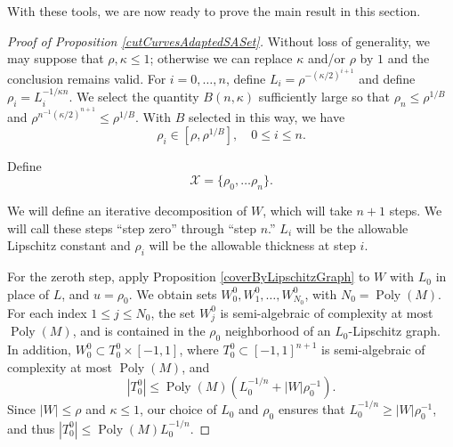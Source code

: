 \documentclass[letterpaper, reqno,11pt]{article}
\numberwithin{equation}{section}
\newcommand{\poly}{\operatorname{Poly}}
\numberwithin{thm}{section}
\theoremstyle{remark}
\begin{document}
With these tools, we are now ready to prove the main result in this section. 


\begin{proof}[Proof of Proposition \ref{cutCurvesAdaptedSASet}]
Without loss of generality, we may suppose that $\rho,\kappa\leq 1$; otherwise we can replace $\kappa$ and/or $\rho$ by $1$ and the conclusion remains valid. For $i=0,\ldots,n$, define $L_i = \rho^{-(\kappa/2)^{i+1}}$ and define $\rho_i = L_i^{-1/\kappa n}$. We select the quantity $B(n,\kappa)$ sufficiently large so that $\rho_n\leq \rho^{1/B}$ and $\rho^{n^{-1} (\kappa/2)^{n+1}}\leq\rho^{1/B}$. With $B$ selected in this way, we have 
\begin{equation}\label{rhoIGeqRho}
\rho_i\in [\rho, \rho^{1/B}],\quad 0\leq i \leq n.
\end{equation}

Define 
\[
\mathcal{X} = \{\rho_0,\ldots\rho_n\}.
\]

We will define an iterative decomposition of $W$, which will take $n+1$ steps. We will call these steps ``step zero'' through ``step $n$.'' $L_i$ will be the allowable Lipschitz constant and $\rho_i$ will be the allowable thickness at step $i$.

For the zeroth step, apply Proposition \ref{coverByLipschitzGraph} to $W$ with $L_0$ in place of $L$, and $u=\rho_0$. We obtain sets $W^0_0, W^{0}_1,\ldots, W^{0}_{N_0}$, with $N_0 = \poly(M)$. For each index $1\leq j\leq N_0$, the set $W^0_j$ is semi-algebraic of complexity at most $\poly(M)$, and is contained in the $\rho_0$ neighborhood of an $L_0$-Lipschitz graph. In addition, $W^0_0 \subset T^0_0\times[-1,1]$, where $T_0^0\subset[-1,1]^{n+1}$ is semi-algebraic of complexity at most $\poly(M)$, and 
\[
|T^0_0|\leq \poly(M)(L_0^{-1/n}+|W|\rho_0^{-1}).
\] 
Since $|W|\leq\rho$ and $\kappa\leq 1$, our choice of $L_0$ and $\rho_0$ ensures that $L_0^{-1/n}\geq |W|\rho_0^{-1}$, and thus $|T^0_0|\leq \poly(M) L_0^{-1/n}$.



\end{proof}
\end{document}
